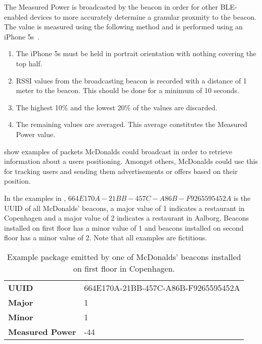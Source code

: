 The Measured Power is broadcasted by the beacon in order for other BLE-enabled devices to more accurately determine a granular proxmity to the beacon. The value is measured using the following method and is performed using an iPhone 5s~\cite{apple:proximity-beacon-spec}.

\begin{enumerate}
\item The iPhone 5s must be held in portrait orientation with nothing covering the top half.
\item RSSI values from the broadcasting beacon is recorded with a distance of 1 meter to the beacon. This should be done for a minimum of 10 seconds.
\item The highest 10\% and the lowest 20\% of the values are discarded.
\item The remaining values are averaged. This average constitutes the Measured Power value.
\end{enumerate}

 show examples of packets McDonalds could broadcast in order to retrieve information about a users positioning. Amongst others, McDonalds could use this for tracking users and sending them advertisements or offers based on their position.

In the examples in , $664E170A-21BB-457C-A86B-F9265595452A$ is the UUID of all McDonalds' beacons, a major value of 1 indicates a restaurant in Copenhagen and a major value of 2 indicates a restaurant in Aalborg. Beacons installed on first floor has a minor value of 1 and beacons installed on second floor has a minor value of 2. Note that all examples are fictitious.

\begin{table}[h!]
\centering
\caption{Example package emitted by one of McDonalds' beacons installed on first floor in Copenhagen.}
\label{tbl:design:ble-positioning:ibeacon1}
\begin{tabular}{ll}
\textbf{UUID}  & 664E170A-21BB-457C-A86B-F9265595452A \\
\textbf{Major} & 1                                    \\
\textbf{Minor} & 1            \\
\textbf{Measured Power} & -44
\end{tabular}
\end{table}


